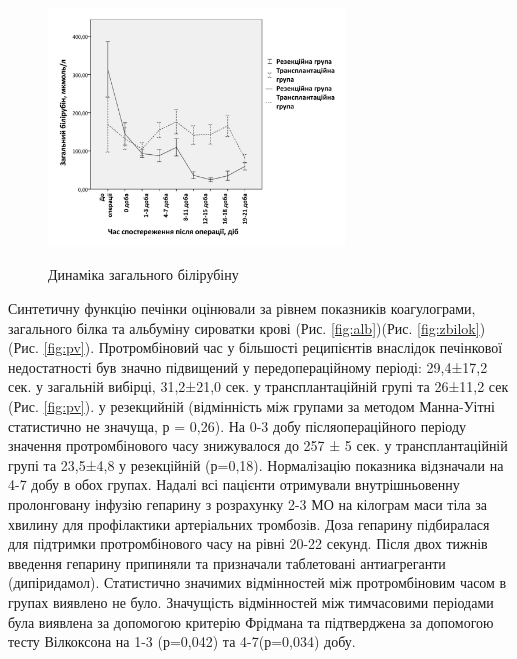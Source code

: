 \begin{figure}[h]
\caption{Динаміка загального білірубіну}
\centering
\includegraphics[width=0.7\textwidth]{Illustrations/graf/ZB.jpeg}
\label{fig:ZB} 
\end{figure}

Синтетичну функцію печінки оцінювали за рівнем показників коагулограми, загального білка та альбуміну сироватки крові (Рис. \ref{fig:alb})(Рис. \ref{fig:zbilok})(Рис. \ref{fig:pv}). Протромбіновий час у більшості реципієнтів внаслідок печінкової недостатності був значно підвищений у передопераційному періоді: 29,4±17,2 сек. у загальній вибірці, 31,2±21,0 сек. у трансплантаційній групі та 26±11,2 сек (Рис. \ref{fig:pv}). у резекцийній (відмінність між групами за методом Манна-Уітні статистично не значуща, р = 0,26). На 0-3 добу післяопераційного періоду значення протромбінового часу знижувалося до 257 ± 5 сек. у трансплантаційній групі та 23,5±4,8 у резекційній (р=0,18). Нормалізацію показника відзначали на 4-7 добу в обох групах. Надалі всі пацієнти отримували внутрішньовенну пролонговану інфузію гепарину з розрахунку 2-3 МО на кілограм маси тіла за хвилину для профілактики артеріальних тромбозів. Доза гепарину підбиралася для підтримки протромбінового часу на рівні 20-22 секунд. Після двох тижнів введення гепарину припиняли та призначали таблетовані антиагреганти (дипіридамол). Статистично значимих відмінностей між протромбіновим часом в групах виявлено не було. Значущість відмінностей між тимчасовими періодами була виявлена за допомогою критерію Фрідмана та підтверджена за допомогою тесту Вілкоксона на 1-3 (р=0,042) та 4-7(р=0,034) добу.


